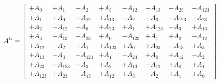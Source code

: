 \begin{equation*}A^G = \left[\begin{array}{cccccccc}
+A_{0} & +A_{1} & +A_{2} & +A_{3} & -A_{12} & -A_{13} & -A_{23} & -A_{123}\\
+A_{1} & +A_{0} & +A_{12} & +A_{13} & -A_{2} & -A_{3} & -A_{123} & -A_{23}\\
+A_{2} & -A_{12} & +A_{0} & +A_{23} & +A_{1} & +A_{123} & -A_{3} & +A_{13}\\
+A_{3} & -A_{13} & -A_{23} & +A_{0} & -A_{123} & +A_{1} & +A_{2} & -A_{12}\\
+A_{12} & -A_{2} & +A_{1} & +A_{123} & +A_{0} & +A_{23} & -A_{13} & +A_{3}\\
+A_{13} & -A_{3} & -A_{123} & +A_{1} & -A_{23} & +A_{0} & +A_{12} & -A_{2}\\
+A_{23} & +A_{123} & -A_{3} & +A_{2} & +A_{13} & -A_{12} & +A_{0} & +A_{1}\\
+A_{123} & +A_{23} & -A_{13} & +A_{12} & +A_{3} & -A_{2} & +A_{1} & +A_{0}
\end{array}\right]
\end{equation*}
